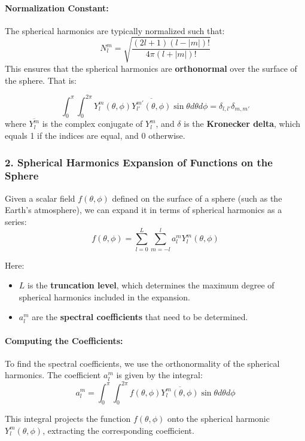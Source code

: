 \paragraph{\textbf{Normalization Constant}:}

The spherical harmonics are typically normalized such that:
$$N_l^m=\sqrt{\frac{(2l+1)(l-|m|)!}{4\pi(l+|m|)!}}$$
This ensures that the spherical harmonics are \textbf{orthonormal} over the surface of the sphere. That is:

$$\int_0^{\pi}\int_0^{2\pi}Y_l^m(\theta, \phi)\overline{Y_{l'}^{m'}(\theta,\phi)}\sin\theta d\theta d\phi=\delta_{l,l'}\delta_{m,m'}$$ where $\overline{Y_l^m}$
is the complex conjugate of $Y_l^m$, and $\delta$ is the \textbf{Kronecker delta}, which equals 1 if the indices are equal, and 0 otherwise.

\subsubsection{2. \textbf{Spherical Harmonics Expansion of Functions on the Sphere}}

Given a scalar field $f(\theta,\phi)$ defined on the surface of a sphere (such as the Earth's atmosphere), we can expand it in terms of spherical harmonics as a series:
$$f(\theta,\phi)=\displaystyle\sum_{l=0}^L\displaystyle\sum_{m=-l}^{l}a_l^mY_l^m(\theta,\phi)$$

Here:

\begin{itemize}
	\item $L$ is the \textbf{truncation level}, which determines the maximum degree of spherical harmonics included in the expansion.
	\item $a_l^m$ are the \textbf{spectral coefficients} that need to be determined.
\end{itemize}

\paragraph{\textbf{Computing the Coefficients}:}

To find the spectral coefficients, we use the orthonormality of the spherical harmonics. The coefficient $a_l^m$ is given by the integral:
$$a_l^m=\int_0^\pi\int_0^{2\pi}f(\theta,\phi)\overline{Y_l^m(\theta,\phi)}\sin\theta d\theta d\phi$$

This integral projects the function $f(\theta,\phi)$ onto the spherical harmonic $Y_l^m(\theta,\phi)$, extracting the corresponding coefficient.

